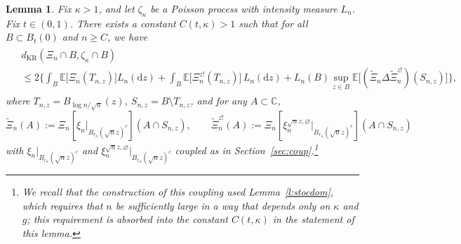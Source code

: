 \documentclass{amsart}
\theoremstyle{plain}
\newtheorem{lemma}[theorem]{Lemma}
\theoremstyle{definition}
\theoremstyle{remark}
\def\E{\mathbb E}
\def\d{\mathrm d}
\begin{document}
\begin{lemma}\label{l:august}
Fix $\kappa >1$, and let  $\zeta_\kappa$ be a Poisson process with intensity measure $L_n$.  Fix $t \in (0,1)$. There exists a constant $C(t, \kappa)>1 $ such that for all $B \subset B_t(0)$ and $n \ge C$, we have 
	\begin{align}
	\begin{split}\label{eq:KRbou}
		&{d_{\mathrm{KR}}}(\Xi_n \cap B,\zeta_\kappa \cap B) \\ & \le  2\Big\{ \int_{B} \E\big[\Xi_n(T_{n,z}) \big] L_n(\d z)+ \int_{B}\E\big[\Xi_n^{z!}(T_{n,z}) \big] \, L_n(\d z) + L_n(B) \sup_{z \in B}\E \big[(\tilde\Xi_n \Delta \tilde\Xi_n^{z!}) (S_{n,z}) \big] \Big\},
		\end{split}
	\end{align}
where $T_{n,z}=B_{\log n/\sqrt n}(z)$, $S_{n,z} = B \setminus T_{n,z}$, and for any $A\subset\mathbb{C}$,
\[ \tilde \Xi_n (A) := \Xi_n\left[\xi_n|_{B_{r_{n}}(\sqrt nz)^c} \right] (A \cap {S_{n,z}} ), 
\qquad \tilde \Xi_n^{z!}(A):= \Xi_n\left[
\xi_n^{\sqrt n z, \varnothing}|_{B_{r_{n}}(\sqrt nz)^c}
 \right] ( A \cap {S_{n,z}})
 \]
 with $\xi_n|_{B_{r_{n}}(\sqrt nz)^c}$ and $\xi_n^{\sqrt n z, \varnothing}|_{B_{r_{n}}(\sqrt nz)^c}$ coupled as in  Section~\ref{sec:coup}.\footnote{We recall that the construction of this coupling used Lemma~\ref{l:stocdom}, which requires that $n$ be sufficiently large in a way that depends only on $\kappa$ and $g$; this requirement is absorbed into the constant $C(t,\kappa)$ in the statement of this lemma.}
\end{lemma}
\end{document}
